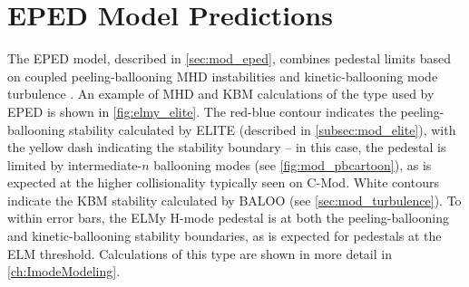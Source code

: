 
\section{EPED Model Predictions}\label{sec:elmy_eped}

The EPED model, described in \cref{sec:mod_eped}, combines pedestal limits based on coupled peeling-ballooning MHD instabilities \cite{Snyder2004,Wilson2002,Wilson2006} and kinetic-ballooning mode turbulence \cite{Snyder2001}.  An example of MHD and KBM calculations of the type used by EPED is shown in \cref{fig:elmy_elite}.  The red-blue contour indicates the peeling-ballooning stability calculated by ELITE (described in \cref{subsec:mod_elite}), with the yellow dash indicating the stability boundary -- in this case, the pedestal is limited by intermediate-$n$ ballooning modes (see \cref{fig:mod_pbcartoon}), as is expected at the higher collisionality typically seen on C-Mod.  White contours indicate the KBM stability calculated by BALOO (see \cref{sec:mod_turbulence}).  To within error bars, the ELMy H-mode pedestal is at both the peeling-ballooning and kinetic-ballooning stability boundaries, as is expected for pedestals at the ELM threshold.  Calculations of this type are shown in more detail in \cref{ch:ImodeModeling}.

\begin{figure}[h]
 \pushtooutside
\end{figure}

